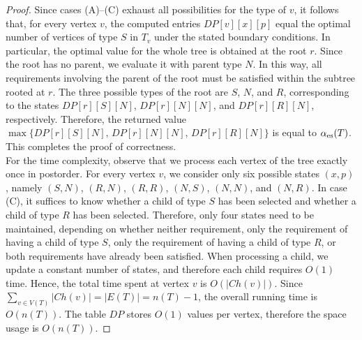 \documentclass[11pt]{article}
\newcommand{\es}{\alpha_{\rm es}}
\newcommand{\rr}[1]{{\color{green!70!black}#1}}%
\begin{document}
\begin{proof}
Since cases (A)--(C) exhaust all possibilities for the type of $v$, it follows that, for every vertex $v$, the computed entries $DP[v][x][p]$ equal the optimal number of vertices of type $S$ in $T_v$ under the stated boundary conditions. In particular, the optimal value for the whole tree is obtained at the root $r$. 
Since the root has no parent, we evaluate it with parent type $N$. In this way, all requirements involving the parent of the root must be satisfied within the subtree rooted at $r$.
The three possible types of the root are $S$, $N$, and $R$, corresponding to the states $DP[r][S][N]$, $DP[r][N][N]$, and $DP[r][R][N]$, respectively.
Therefore, the returned value 
$\max\{DP[r][S][N],\,DP[r][N][N],\,DP[r][R][N]\}$ is equal to $\es(T)$. This completes the proof of correctness. \\ %

For the time complexity, observe that we process each vertex of the tree exactly once in postorder. For every vertex $v$, we consider only six possible states $(x,p)$, namely $(S,N)$, $(R,N)$, $(R,R)$, $(N,S)$, $(N,N)$, and $(N,R)$. 
In case (C), it suffices to know whether a child of type $S$ has been selected and whether a child of type $R$ has been selected. 
Therefore, only four states need to be maintained, depending on whether neither requirement, only the requirement of having a child of type $S$, only the requirement of having a child of type $R$, or both requirements have already been satisfied.
When processing a child, we update a constant number of states, and therefore each child requires $O(1)$ time. Hence, the total time spent at vertex $v$ is $O(|Ch(v)|)$.
Since $\sum_{v \in V(T)} |Ch(v)| = |E(T)| = n(T) - 1$, the overall running time is $O(n(T))$. The table $DP$ stores $O(1)$ values per vertex, therefore the space usage is $O(n(T))$.

\end{proof}
\end{document}
